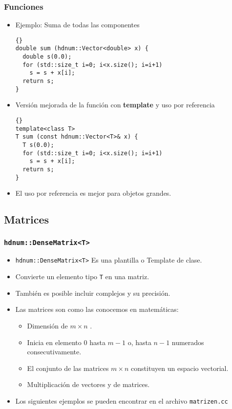 \documentclass[a4paper,11pt]{article}
\theoremstyle{definition}
\begin{document}
\begin{frame}[fragile]
\frametitle{Funciones}
\begin{itemize}
\item Ejemplo: Suma de todas las componentes \\
{\footnotesize{\begin{lstlisting}{}
double sum (hdnum::Vector<double> x) {
  double s(0.0);
  for (std::size_t i=0; i<x.size(); i=i+1)
    s = s + x[i];
  return s;
}
\end{lstlisting}}}
\item Versión mejorada de la función con \textbf{template} y uso por referencia\\
{\footnotesize{\begin{lstlisting}{}
template<class T>
T sum (const hdnum::Vector<T>& x) {
  T s(0.0);
  for (std::size_t i=0; i<x.size(); i=i+1)
    s = s + x[i];
  return s;
}
\end{lstlisting}}}
\item El uso por referencia es mejor para objetos grandes.
\end{itemize}
\end{frame}

\subsection{Matrices}

\begin{frame}[fragile]
\frametitle{\lstinline{hdnum::DenseMatrix<T>}}
\begin{itemize}
\item \lstinline{hdnum::DenseMatrix<T>} Es una plantilla o Template de clase.
\item Convierte un elemento tipo \lstinline{T} en una matriz.
\item También es posible incluir complejos y su precisión.
\item Las matrices son como las conocemos en matemáticas:
\begin{itemize}
\item Dimensión de $m\times n$ .
\item Inicia en elemento $0$ hasta $m-1$ o, hasta $n-1$ numerados consecutivamente.
\item El conjunto de las matrices $m\times n$ constituyen un espacio vectorial.
\item Multiplicación de vectores y de matrices.
\end{itemize}
\item Los siguientes ejemplos se pueden encontrar en el archivo \lstinline{matrizen.cc}
\end{itemize}
\end{frame}
\end{document}
